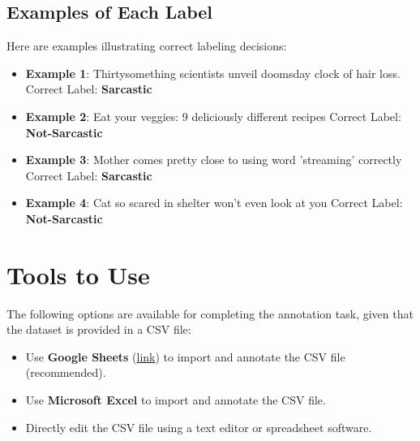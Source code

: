 \documentclass[12pt]{article}
\begin{document}
\subsection{Examples of Each Label}
Here are examples illustrating correct labeling decisions:

\begin{itemize}
    \item \textbf{Example 1}: Thirtysomething scientists unveil doomsday clock of hair loss. \newline
    Correct Label: \textbf{Sarcastic} 

    \item \textbf{Example 2}: Eat your veggies: 9 deliciously different recipes \newline
    Correct Label: \textbf{Not-Sarcastic} 

    \item \textbf{Example 3}: Mother comes pretty close to using word 'streaming' correctly \newline
    Correct Label: \textbf{Sarcastic} 

    \item \textbf{Example 4}: Cat so scared in shelter won't even look at you \newline
    Correct Label: \textbf{Not-Sarcastic} 

\end{itemize}

\section{Tools to Use}  
The following options are available for completing the annotation task, given that the dataset is provided in a CSV file:  

\begin{itemize}  
    \item Use \textbf{Google Sheets} (\href{https://workspace.google.com/intl/en_ca/products/sheets/}{link}) to import and annotate the CSV file (recommended).  
    \item Use \textbf{Microsoft Excel} to import and annotate the CSV file.  
    \item Directly edit the CSV file using a text editor or spreadsheet software.  

\end{itemize}  
\end{document}
